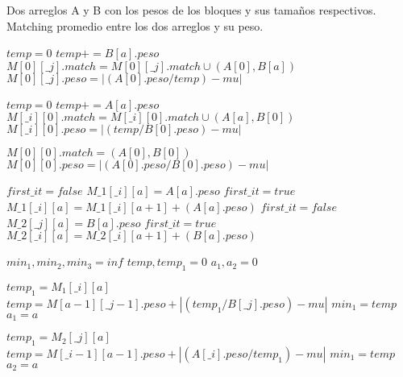 \documentclass[12pt]{article}
\newcommand{\TITLE}[1]{\item[#1]}
\begin{document}
\begin{algorithmic}[1]
    \REQUIRE Dos arreglos A y B con los pesos de los bloques y sus tamaños respectivos.
    \ENSURE Matching promedio entre los dos arreglos y su peso.
    \TITLE{\textsc{Min-Matching-Promedio-Prod-Din}$(A,B,i,j,mu)$}
        \STATE $temp = 0$
            \STATE $temp += B[a].peso$
            \STATE $M[0][\_j].match = M[0][\_j].match \cup (A[0],B[a])$
        \ENDFOR
        \STATE $M[0][\_j].peso = |(A[0].peso / temp) - mu|$
    \ENDFOR
    
        \STATE $temp = 0$
            \STATE $temp += A[a].peso$
            \STATE $M[\_i][0].match = M[\_i][0].match \cup (A[a],B[0])$
        \ENDFOR
        \STATE $M[\_i][0].peso = |(temp / B[0].peso) - mu|$
    \ENDFOR
    
    \STATE $M[0][0].match = (A[0], B[0])$
    \STATE $M[0][0].peso = |(A[0].peso / B[0].peso) - mu|$
    
        \STATE $first\_it = false$
                \STATE $M\_1[\_i][a] = A[a].peso$
                \STATE $first\_it = true$
            \ELSE
                \STATE $M\_1[\_i][a] = M\_1[\_i][a + 1] + (A[a].peso)$
            \ENDIF
        \ENDFOR
    \ENDFOR
        \STATE $first\_it = false$
                \STATE $M\_2[\_j][a] = B[a].peso$
                \STATE $first\_it = true$
            \ELSE
                \STATE $M\_2[\_i][a] = M\_2[\_i][a + 1] + (B[a].peso)$
            \ENDIF
        \ENDFOR
    \ENDFOR
    
            \STATE $min_1, min_2, min_3 = inf$
            \STATE $temp, temp_1 = 0$
            \STATE $a_1, a_2 = 0$
            
                \STATE $temp_1 = M_1[\_i][a]$
                \STATE $temp = M[a - 1][\_j - 1].peso + |(temp_1 / B[\_j].peso) - mu|$
                    \STATE $min_1 = temp$
                    \STATE $a_1 = a$
                \ENDIF
            \ENDFOR
            
                \STATE $temp_1 = M_2[\_j][a]$
                \STATE $temp = M[\_i - 1][a - 1].peso + |(A[\_i].peso / temp_1) - mu|$
                    \STATE $min_1 = temp$
                    \STATE $a_2 = a$
                \ENDIF
            \ENDFOR
            

\end{algorithmic}
\end{document}
